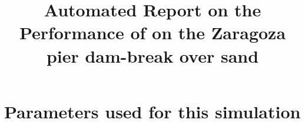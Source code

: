 \documentclass[11pt,a4paper]{article}%
\begin{document}
 

\title{Automated Report on the Performance of \anuga{} on the Zaragoza pier dam-break over sand}
\maketitle




\section{Parameters used for this simulation}






\end{document}
